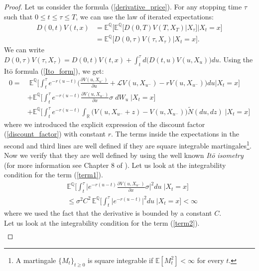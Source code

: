 \documentclass[a4paper,10pt]{article}
\newcommand{\numberset}{\mathbb}
\newcommand{\R}{\numberset{R}}
\newcommand{\E}{\numberset{E}}
\newcommand{\Q}{\numberset{Q}}
\newcommand{\LL}{\mathcal{L}}
\begin{document}
\begin{proof}
 Let us consider the formula (\ref{derivative_price}). 
 For any stopping time $\tau$ such that $0 \leq t \leq \tau \leq T$, we can use the law of iterated expectations:
 \begin{align*}
   D(0,t) V(t,x) &= \E^{\Q}  \biggl[ \E^{\Q} \bigl[ D(0,T) V(T,X_T) \big| X_{\tau} \bigr] \bigg| X_t=x \biggr] \\
                 &= \E^{\Q} \bigl[ D(0,\tau) V(\tau,X_{\tau}) \big| X_t=x \bigr]. 
 \end{align*}
 We can write $D(0,\tau) V(\tau,X_{\tau}) = D(0,t) V(t,x) + \int_t^{\tau} d\bigl(D(t,u) V(u,X_u)\bigr) du$. 
 Using the It\=o formula (\ref{Ito_form}), we get:
  \begin{align}\label{proof_Cont_V}
  0 =& \; \E^{\Q} \biggl[ \int_t^{\tau} e^{-r(u-t)} \biggl( \frac{\partial V(u,X_{u^-})}{\partial u} + \LL V(u,X_{u^-}) -r V(u,X_{u^-}) \biggr) du \bigg| X_t=x \biggr] \\ \label{term1}
     & + \E^{\Q} \biggl[ \int_t^{\tau} e^{-r(u-t)} \frac{\partial V(u,X_{u^-})}{\partial x} \sigma \; dW_u \; \bigg| X_t=x \biggr] \\ \label{term2}
     & + \E^{\Q} \biggl[ \int_t^{\tau} e^{-r(u-t)} \int_{\R} \bigl( V(u,X_{u^-} + z) - V(u,X_{u^-}) \bigr) \tilde N(du,dz) \; \bigg| X_t=x \biggr]
 \end{align}
 where we introduced the explicit expression of the discount factor (\ref{discount_factor}) with constant $r$.
 The terms inside the expectations in the second and third lines are well defined if they are square integrable martingales\footnote{A martingale $\{M_t\}_{t\geq0}$ is square 
 integrable if $\E[M_t^2] < \infty$ for every $t$.}. Now we verify that they are well defined by using the well known \emph{It\=o isometry} 
 (for more information see Chapter 8 of \cite{Cont}). 
 Let us look at the integrability condition for the term (\ref{term1}). 
  \begin{align*}
  & \E^{\Q} \biggl[ \int_t^{\tau} \big| e^{-r(u-t)} \frac{\partial V(u,X_{u^-})}{\partial x} \sigma \big|^2 du \; \bigg| X_t=x \biggr] \\
  & \leq \sigma^2 C^2\, \E^{\Q} \biggl[ \int_t^{\tau} \big| e^{-r(u-t)} \big|^2 du \; \bigg| X_t=x \biggr] < \infty
 \end{align*}
 where we used the fact that the derivative is bounded by a constant $C$.\\
 Let us look at the integrability condition for the term (\ref{term2}).
  \begin{align*}

\end{align*}
\end{proof}
\end{document}
